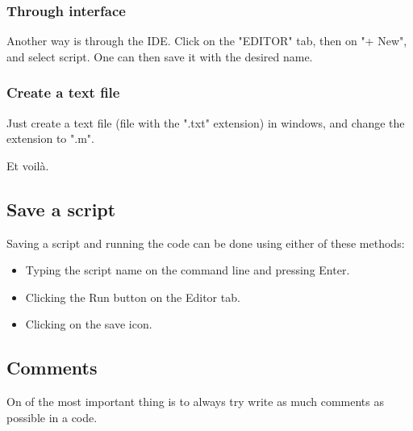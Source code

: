 		\subsubsection{Through \matlab interface}
			Another way is through the IDE.
			Click on the "EDITOR" tab, then on "+ New", and select script.
			One can then save it with the desired name.

		\subsubsection{Create a text file}
			Just create a text file (file with the ".txt" extension) in windows, and change the extension to ".m".

		Et voilà.

	\subsection{Save a script}
		Saving a script and running the code can be done using either of these methods:
		\begin{itemize}
			\item Typing the script name on the command line and pressing Enter. 
			\item Clicking the Run button on the Editor tab.
			\item Clicking on the save icon.
		\end{itemize}

	\subsection{Comments}
		On of the most important thing is to always try write as much comments as possible in a code.


